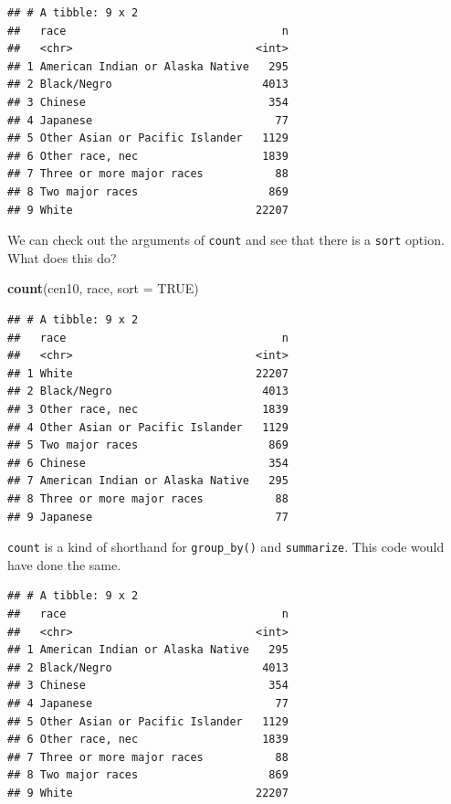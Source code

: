 \documentclass[]{book}
\newenvironment{Shaded}{\begin{snugshade}}{\end{snugshade}}
\newcommand{\KeywordTok}[1]{\textcolor[rgb]{0.13,0.29,0.53}{\textbf{#1}}}
\newcommand{\DataTypeTok}[1]{\textcolor[rgb]{0.13,0.29,0.53}{#1}}
\newcommand{\StringTok}[1]{\textcolor[rgb]{0.31,0.60,0.02}{#1}}
\newcommand{\OtherTok}[1]{\textcolor[rgb]{0.56,0.35,0.01}{#1}}
\newcommand{\OperatorTok}[1]{\textcolor[rgb]{0.81,0.36,0.00}{\textbf{#1}}}
\newcommand{\NormalTok}[1]{#1}
\theoremstyle{definition}
\theoremstyle{definition}
\theoremstyle{definition}
\theoremstyle{remark}
\begin{document}
\begin{verbatim}
## # A tibble: 9 x 2
##   race                                 n
##   <chr>                            <int>
## 1 American Indian or Alaska Native   295
## 2 Black/Negro                       4013
## 3 Chinese                            354
## 4 Japanese                            77
## 5 Other Asian or Pacific Islander   1129
## 6 Other race, nec                   1839
## 7 Three or more major races           88
## 8 Two major races                    869
## 9 White                            22207
\end{verbatim}

We can check out the arguments of \texttt{count} and see that there is a
\texttt{sort} option. What does this do?

\begin{Shaded}
\begin{Highlighting}[]
\KeywordTok{count}\NormalTok{(cen10, race, }\DataTypeTok{sort =} \OtherTok{TRUE}\NormalTok{)}
\end{Highlighting}
\end{Shaded}

\begin{verbatim}
## # A tibble: 9 x 2
##   race                                 n
##   <chr>                            <int>
## 1 White                            22207
## 2 Black/Negro                       4013
## 3 Other race, nec                   1839
## 4 Other Asian or Pacific Islander   1129
## 5 Two major races                    869
## 6 Chinese                            354
## 7 American Indian or Alaska Native   295
## 8 Three or more major races           88
## 9 Japanese                            77
\end{verbatim}

\texttt{count} is a kind of shorthand for \texttt{group\_by()} and
\texttt{summarize}. This code would have done the same.

\begin{Shaded}
\end{Shaded}

\begin{verbatim}
## # A tibble: 9 x 2
##   race                                 n
##   <chr>                            <int>
## 1 American Indian or Alaska Native   295
## 2 Black/Negro                       4013
## 3 Chinese                            354
## 4 Japanese                            77
## 5 Other Asian or Pacific Islander   1129
## 6 Other race, nec                   1839
## 7 Three or more major races           88
## 8 Two major races                    869
## 9 White                            22207
\end{verbatim}
\end{document}

